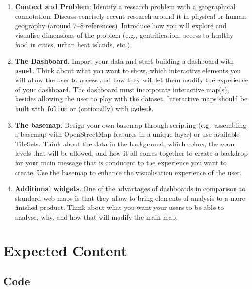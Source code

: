 \documentclass[
  letterpaper,
  DIV=11,
  numbers=noendperiod]{scrreprt}
\providecommand{\tightlist}{%
  \setlength{\itemsep}{0pt}\setlength{\parskip}{0pt}}\usepackage{longtable,booktabs,array}
\begin{document}
\begin{enumerate}
\def\labelenumi{\arabic{enumi}.}
\tightlist
\item
  \textbf{Context and Problem}: Identify a research problem with a
  geographical connotation. Discuss concisely recent research around it
  in physical or human geography (around 7--8 references). Introduce how
  you will explore and visualise dimensions of the problem (e.g.,
  gentrification, access to healthy food in cities, urban heat islands,
  etc.).
\item
  \textbf{The Dashboard}. Import your data and start building a
  dashboard with \texttt{panel}. Think about what you want to show,
  which interactive elements you will allow the user to access and how
  they will let them modify the experience of your dashboard. The
  dashboard must incorporate interactive map(s), besides allowing the
  user to play with the dataset. Interactive maps should be built with
  \texttt{folium} or (optionally) with \texttt{pydeck}.
\item
  \textbf{The basemap}. Design your own basemap through scripting
  (e.g.~assembling a basemap with OpenStreetMap features in a unique
  layer) or use available TileSets. Think about the data in the
  background, which colors, the zoom levels that will be allowed, and
  how it all comes together to create a backdrop for your main message
  that is conducent to the experience you want to create. Use the
  basemap to enhance the visualisation experience of the user.
\item
  \textbf{Additional widgets}. One of the advantages of dashboards in
  comparison to standard web maps is that they allow to bring elements
  of analysis to a more finished product. Think about what you want your
  users to be able to analyse, why, and how that will modify the main
  map.
\end{enumerate}

\section*{Expected Content}\label{expected-content-1}


\subsection*{Code}\label{code-1}
\end{document}
